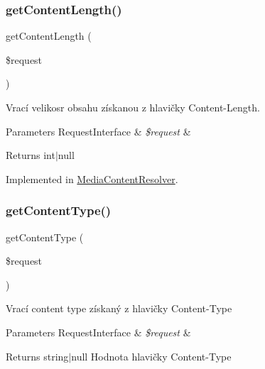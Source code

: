 \subsubsection{\texorpdfstring{get\+Content\+Length()}{getContentLength()}}
{\footnotesize\ttfamily get\+Content\+Length (\begin{DoxyParamCaption}\item[{Server\+Request\+Interface}]{\$request }\end{DoxyParamCaption})}

Vrací velikosr obsahu získanou z hlavičky Content-\/\+Length.


\begin{DoxyParams}[1]{Parameters}
Request\+Interface & {\em \$request} & \\
\hline
\end{DoxyParams}
\begin{DoxyReturn}{Returns}
int$\vert$null 
\end{DoxyReturn}


Implemented in \mbox{\hyperlink{class_pes_1_1_http_1_1_request_1_1_media_content_resolver_aa5886a7afae000593a639e649d411ca5}{Media\+Content\+Resolver}}.

\mbox{\label{interface_pes_1_1_http_1_1_request_1_1_media_content_resolver_interface_a5e069384f33f60671b832beae5260d9b}} 
\subsubsection{\texorpdfstring{get\+Content\+Type()}{getContentType()}}
{\footnotesize\ttfamily get\+Content\+Type (\begin{DoxyParamCaption}\item[{Server\+Request\+Interface}]{\$request }\end{DoxyParamCaption})}

Vrací content type získaný z hlavičky Content-\/\+Type


\begin{DoxyParams}[1]{Parameters}
Request\+Interface & {\em \$request} & \\
\hline
\end{DoxyParams}
\begin{DoxyReturn}{Returns}
string$\vert$null Hodnota hlavičky Content-\/\+Type 
\end{DoxyReturn}


